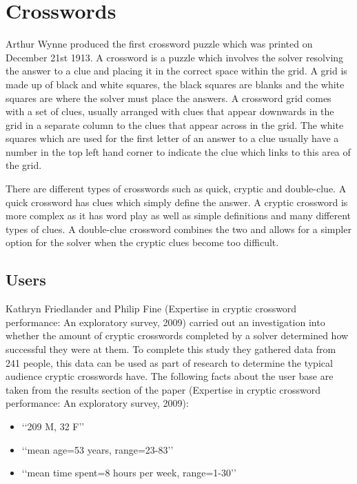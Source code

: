 \section{Crosswords}

Arthur Wynne produced the first crossword puzzle which was printed on December 21st 1913. A crossword is a puzzle which involves the solver resolving the answer to a clue and placing it in the correct space within the grid. A grid is made up of black and white squares, the black squares are blanks and the white squares are where the solver must place the answers. A crossword grid comes with a set of clues, usually arranged with clues that appear downwards in the grid in a separate column to the clues that appear across in the grid. The white squares which are used for the first letter of an answer to a clue usually have a number in the top left hand corner to indicate the clue which links to this area of the grid.

There are different types of crosswords such as quick, cryptic and double-clue. A quick crossword has clues which simply define the answer. A cryptic crossword is more complex as it has word play as well as simple definitions and many different types of clues. A double-clue crossword combines the two and allows for a simpler option for the solver when the cryptic clues become too difficult.

\newpage
\subsection{Users}
Kathryn Friedlander and Philip Fine (Expertise in cryptic crossword performance: An exploratory survey, 2009) carried out an investigation into whether the amount of cryptic crosswords completed by a solver determined how successful they were at them. To complete this study they gathered data from 241 people, this data can be used as part of research to determine the typical audience cryptic crosswords have. The following facts about the user base are taken from the results section of the paper (Expertise in cryptic crossword performance: An exploratory survey, 2009):

\begin{itemize}
	\item \lq\lq 209 M, 32 F\rq\rq
	\item \lq\lq  mean age=53 years, range=23-83\rq\rq
	\item \lq\lq  mean time spent=8 hours per week, range=1-30\rq\rq
\end{itemize}

